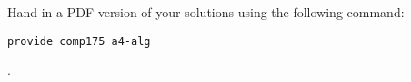 \documentclass[10pt,twocolumn]{article}
\begin{document}
Hand in a PDF version of your solutions using the following command:
\begin{center}
 {\tt provide comp175 a4-alg}
\end{center}
.\\\\\\\\\\\\\\\\\\\\\\\\



\end{document}
